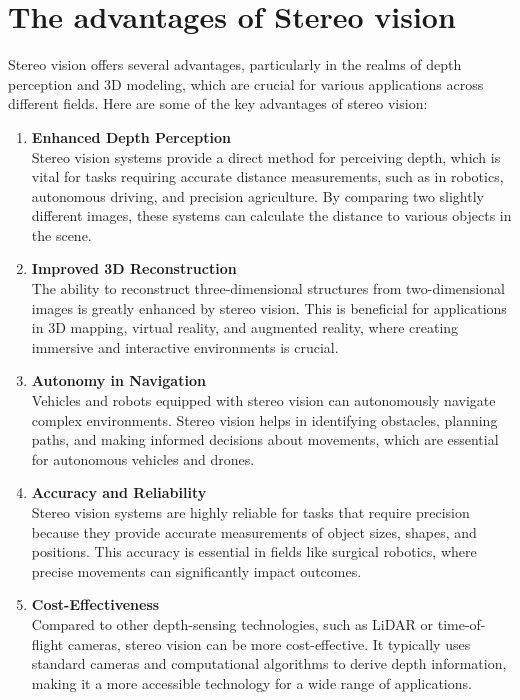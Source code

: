 \documentclass[22pt]{report}
\begin{document}
    \section{The advantages of Stereo vision}
        Stereo vision offers several advantages, particularly in the realms of depth perception and 3D modeling, which are crucial for various applications across different fields. Here are some of the key advantages of stereo vision:
        \begin{enumerate}
            \item \textbf{Enhanced Depth Perception}\\
                Stereo vision systems provide a direct method for perceiving depth, which is vital for tasks requiring accurate distance measurements, such as in robotics, autonomous driving, and precision agriculture. By comparing two slightly different images, these systems can calculate the distance to various objects in the scene. 
            \item \textbf{Improved 3D Reconstruction}\\
                The ability to reconstruct three-dimensional structures from two-dimensional images is greatly enhanced by stereo vision. This is beneficial for applications in 3D mapping, virtual reality, and augmented reality, where creating immersive and interactive environments is crucial.
            \item \textbf{Autonomy in Navigation}\\
                Vehicles and robots equipped with stereo vision can autonomously navigate complex environments. Stereo vision helps in identifying obstacles, planning paths, and making informed decisions about movements, which are essential for autonomous vehicles and drones.
            \item \textbf{Accuracy and Reliability} \\
                Stereo vision systems are highly reliable for tasks that require precision because they provide accurate measurements of object sizes, shapes, and positions. This accuracy is essential in fields like surgical robotics, where precise movements can significantly impact outcomes.
            \item \textbf{Cost-Effectiveness} \\
                Compared to other depth-sensing technologies, such as LiDAR or time-of-flight cameras, stereo vision can be more cost-effective. It typically uses standard cameras and computational algorithms to derive depth information, making it a more accessible technology for a wide range of applications.

\end{enumerate}
\end{document}
